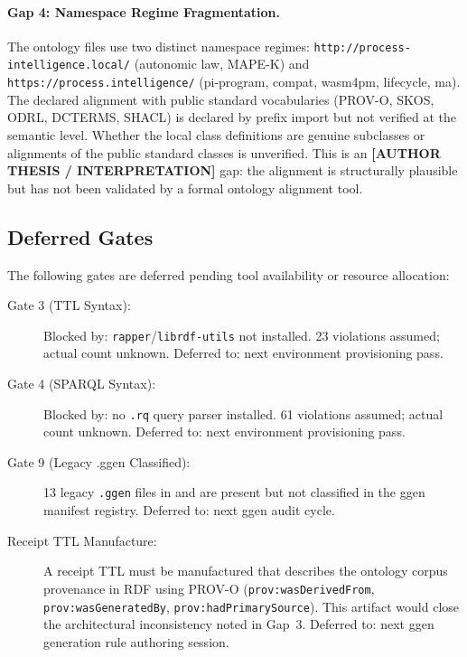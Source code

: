 \paragraph{Gap 4: Namespace Regime Fragmentation.}
The ontology files use two distinct namespace regimes: \texttt{http://process-intelligence.local/}
(autonomic law, MAPE-K) and \texttt{https://process.intelligence/} (pi-program, compat,
wasm4pm, lifecycle, ma). The declared alignment with public standard vocabularies (PROV-O,
SKOS, ODRL, DCTERMS, SHACL) is declared by prefix import but not verified at the
semantic level. Whether the local class definitions are genuine subclasses or alignments
of the public standard classes is unverified. This is an \textbf{[AUTHOR THESIS / INTERPRETATION]}
gap: the alignment is structurally plausible but has not been validated by a formal ontology
alignment tool.

\subsection{Deferred Gates}
\label{sec:research-open-ontologies-deferred-gates}

The following gates are deferred pending tool availability or resource allocation:

\begin{description}
  \item[Gate 3 (TTL Syntax):]
        Blocked by: \texttt{rapper}/\texttt{librdf-utils} not installed.
        23 violations assumed; actual count unknown.
        Deferred to: next environment provisioning pass.

  \item[Gate 4 (SPARQL Syntax):]
        Blocked by: no \texttt{.rq} query parser installed.
        61 violations assumed; actual count unknown.
        Deferred to: next environment provisioning pass.

  \item[Gate 9 (Legacy .ggen Classified):]
        13 legacy \texttt{.ggen} files in  and
         are present but not classified
        in the ggen manifest registry.
        Deferred to: next ggen audit cycle.

  \item[Receipt TTL Manufacture:]
        A receipt TTL must be manufactured that describes the ontology corpus provenance
        in RDF using PROV-O (\texttt{prov:wasDerivedFrom}, \texttt{prov:wasGeneratedBy},
        \texttt{prov:hadPrimarySource}). This artifact would close the architectural
        inconsistency noted in Gap~3.
        Deferred to: next ggen generation rule authoring session.
\end{description}

